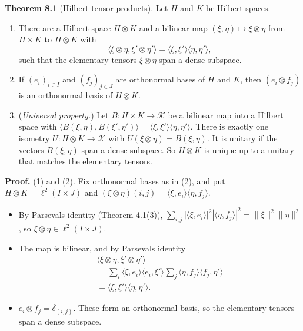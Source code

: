 \documentclass[
  english,
  11pt,
  a4paper,
]{article}
\providecommand{\tightlist}{%
  \setlength{\itemsep}{0pt}\setlength{\parskip}{0pt}}
\begin{document}
\textbf{Theorem 8.1} (Hilbert tensor products). Let \(H\) and \(K\) be
Hilbert spaces.

\begin{enumerate}
\tightlist
\item
  There are a Hilbert space \(H\otimes K\) and a bilinear map
  \((\xi,\eta)\mapsto\xi\otimes\eta\) from \(H\times K\) to
  \(H\otimes K\) with
  \[\langle\xi\otimes\eta,\xi'\otimes\eta'\rangle=\langle\xi,\xi'\rangle\langle\eta,\eta'\rangle ,\]
  such that the elementary tensors \(\xi\otimes\eta\) span a dense
  subspace.
\item
  If \((e_i)_{i\in I}\) and \((f_j)_{j\in J}\) are orthonormal bases of
  \(H\) and \(K\), then \((e_i\otimes f_j)\) is an orthonormal basis of
  \(H\otimes K\).
\item
  (\emph{Universal property.}) Let \(B:H\times K\to\mathcal K\) be a
  bilinear map into a Hilbert space with
  \(\langle B(\xi,\eta),B(\xi',\eta')\rangle=\langle\xi,\xi'\rangle\langle\eta,\eta'\rangle\).
  There is exactly one isometry \(U:H\otimes K\to\mathcal K\) with
  \(U(\xi\otimes\eta)=B(\xi,\eta)\). It is unitary if the vectors
  \(B(\xi,\eta)\) span a dense subspace. So \(H\otimes K\) is unique up
  to a unitary that matches the elementary tensors.
\end{enumerate}

\textbf{Proof.} (1) and (2). Fix orthonormal bases as in (2), and put
\(H\otimes K=\ell^2(I\times J)\) and
\((\xi\otimes\eta)(i,j)=\langle\xi,e_i\rangle\langle\eta,f_j\rangle\).

\begin{itemize}
\tightlist
\item
  By Parseval\textquotesingle s identity (Theorem 4.1(3)),
  \(\sum_{i,j}|\langle\xi,e_i\rangle|^2|\langle\eta,f_j\rangle|^2=\|\xi\|^2\|\eta\|^2\),
  so \(\xi\otimes\eta\in\ell^2(I\times J)\).
\item
  The map is bilinear, and by Parseval\textquotesingle s identity
  \[\begin{gathered}
  \langle\xi\otimes\eta,\xi'\otimes\eta'\rangle\\
  =\sum_i\langle\xi,e_i\rangle\langle e_i,\xi'\rangle\sum_j\langle\eta,f_j\rangle\langle f_j,\eta'\rangle\\
  =\langle\xi,\xi'\rangle\langle\eta,\eta'\rangle .
  \end{gathered}\]
\item
  \(e_i\otimes f_j=\delta_{(i,j)}\). These form an orthonormal basis, so
  the elementary tensors span a dense subspace.
\end{itemize}
\end{document}
